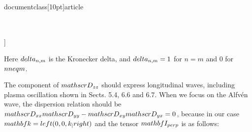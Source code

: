 \\documentclass[10pt]{article}
\begin{document}
{{{{\\[
\\boldsymbol{\\Pi}=\\left[\\begin{array}{ccc}
\\frac{v_{\\perp}^{2}}{4}\\left(\\delta_{n, 1}+\\delta_{n,-1}\\right), & i \\frac{v_{\\perp}^{2}}{4}\\left(\\delta_{n, 1}-\\delta_{n,-1}\\right), & 0  \\tag{6.145}\\\\
-i \\frac{v_{\\perp}^{2}}{4}\\left(\\delta_{n, 1}-\\delta_{n,-1}\\right), & \\frac{v_{\\perp}^{2}}{4}\\left(\\delta_{n, 1}+\\delta_{n,-1}\\right), & 0 \\\\
0, & 0, & v_{\\|}^{2} \\delta_{n, 0}
\\end{array}\\right]
\\]

Here $\\delta_{n, m}$ is the Kronecker delta, and $\\delta_{n, m}=1$ for $n=m$ and 0 for $n \\neq m$.

The component of $\\mathscr{D}_{z z}$ should express longitudinal waves, including plasma oscillation shown in Sects. 5.4, 6.6 and 6.7. When we focus on the Alfvén wave, the dispersion relation should be $\\mathscr{D}_{x x} \\mathscr{D}_{y y}-\\mathscr{D}_{x y} \\mathscr{D}_{y x}=0$, because in our case $\\mathbf{k}=\\left(0,0, k_{\\|}\\right)$ and the tensor $\\mathbf{I}_{\\perp}$ is as follows:

}}}}
\end{document}

